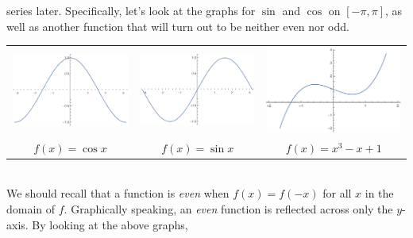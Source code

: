 series later. Specifically, let's look at the graphs for $\sin$ and $\cos$ on
$[-\pi,\pi]$, as well as another function that will turn out to be neither even
nor odd.
\begin{center}
\begin{tabular}{c c c}
\includegraphics[scale=0.4]{cos_eo} & \includegraphics[scale=0.4]{sin_eo} & \includegraphics[scale=0.4]{cube_eo}\\
$f(x) = \cos{x}$ & $f(x) = \sin{x}$ & $f(x) = x^{3}-x +1$
\end{tabular}
\end{center}
\noindent\\
\indent We should recall that a function is \textit{even} when $f(x) = f(-x)$
for all $x$ in the domain of $f$. Graphically speaking, an \textit{even}
function is reflected across only the $y$-axis. By looking at the above graphs,
